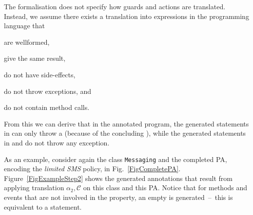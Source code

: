 The formalisation does not specify how guards and actions are
translated. Instead, we assume there exists a translation into
expressions in the programming language that
\begin{inparaenum}
\item are wellformed,
\item give the same result,
\item do not have side-effects,
\item do not throw exceptions, and
\item do not contain method calls.
\end{inparaenum}
From this we can derive that in the annotated program, the generated
statements in \preset can only throw a \JMLExc (because of the
concluding \Assert), while the generated statements in \postset
and \excset do not throw any exception.

As an example, consider again
the class \texttt{Messaging} and the completed
PA, encoding the \emph{limited SMS} policy, in
Fig.~\ref{FigCompletePA}. Figure~\ref{FigExampleStep2} shows the
generated annotations that result from applying translation
\(\alpha_2,\mathcal{C}\) on this class and this PA. Notice that for methods
and events that are not involved in the property, an empty \CaseJML is
generated~--~this is equivalent to a
\Skip statement.

